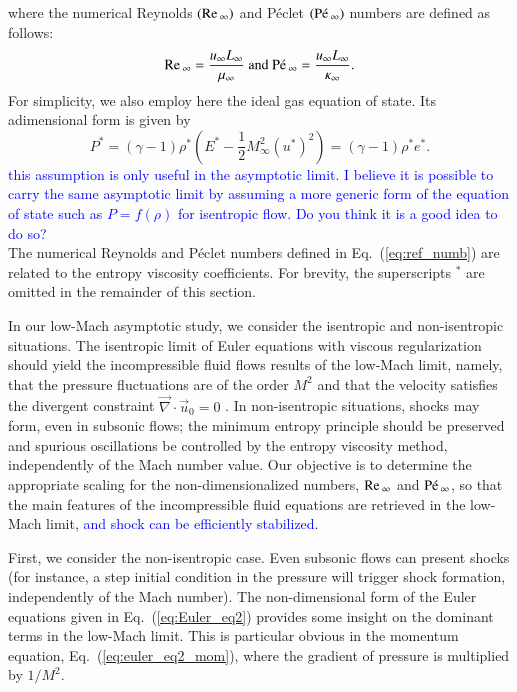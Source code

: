 \documentclass[preprint,10pt]{elsarticle}
\renewcommand{\div}{\vec{\nabla}\! \cdot \!}
\renewcommand{\Re}{\textrm{Re\,}}
\newcommand{\Pe}{\textrm{P\'e\,}}
\newcommand{\eqt}[1]{Eq.~(\ref{#1})}                     %
\newcommand{\tcb}[1]{\textcolor{blue}{#1}}
\begin{document}
where the numerical Reynolds $(\Re_\infty)$ and P\'eclet $(\Pe_\infty)$ numbers are defined as follows:
%
\begin{equation}
\label{eq:ref_numb}
\Re_\infty = \frac{u_\infty L_\infty}{\mu_\infty} \text{ and }
\Pe_\infty = \frac{u_\infty L_\infty}{\kappa_\infty} \text{.}
\end{equation}
%
For simplicity, we also employ here the ideal gas equation of state. Its adimensional form is given by
%
\begin{equation}
\label{eq:euler_eq2_eos}
P^* = \left( \gamma-1 \right) \rho^*\left(  E^* -\frac{1}{2} M_\infty^2 (u^*)^2 \right) = \left( \gamma-1 \right) \rho^* e^*.
\end{equation}
\tcb{this assumption is only useful in the asymptotic limit. I believe it is possible to carry the same asymptotic limit by assuming a more generic form of the equation of state such as $P = f(\rho)$ for isentropic flow. Do you think it is a good idea to do so?}\\
%
The numerical Reynolds and P\'eclet numbers defined in \eqt{eq:ref_numb} are related to the entropy viscosity coefficients. 
For brevity, the superscripts $^*$ are omitted in the remainder of this section. 

In our low-Mach asymptotic study, we consider the isentropic and non-isentropic situations. The isentropic limit of Euler equations with viscous regularization should yield the incompressible fluid flows results of the low-Mach limit, namely, that the pressure fluctuations are of the order $M^2$ and that the velocity satisfies the divergent constraint $\div \vec{u}_0 = 0$ \cite{LowMach1, LowMach2, LowMach3}. In non-isentropic situations, shocks may form, even in subsonic flows; the minimum entropy principle should be preserved and spurious oscillations be controlled by the entropy viscosity method, independently of the Mach number value.
Our objective is to determine the appropriate scaling for the non-dimensionalized numbers, $\Re_\infty$ and $\Pe_\infty$, so that the main features of the incompressible fluid equations are retrieved in the low-Mach limit, \tcb{and shock can be efficiently stabilized}.

First, we consider the non-isentropic case. Even subsonic flows can present shocks (for instance, a step initial condition in the pressure will trigger shock formation, independently of the Mach number). The non-dimensional form of the Euler equations given in \eqt{eq:Euler_eq2} provides some insight on the dominant terms in the low-Mach limit. This is particular obvious in the momentum equation, \eqt{eq:euler_eq2_mom}, where the gradient of pressure is multiplied by $1/M^2$. 
\end{document}
